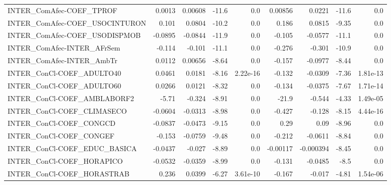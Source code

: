 \begin{tabular}{lrrrrrrrr}
INTER\_ComAfec-COEF\_TPROF              &      0.0013 &      0.00608 &    -11.6 &      0.0 &    0.00856 &      0.0221 &        -11.6 &           0.0 \\
INTER\_ComAfec-COEF\_USOCINTURON        &       0.101 &       0.0804 &    -10.2 &      0.0 &      0.186 &      0.0815 &        -9.35 &           0.0 \\
INTER\_ComAfec-COEF\_USODISPMOB         &     -0.0895 &      -0.0844 &    -11.9 &      0.0 &     -0.105 &     -0.0577 &        -11.1 &           0.0 \\
INTER\_ComAfec-INTER\_AFrSem            &      -0.114 &       -0.101 &    -11.1 &      0.0 &     -0.276 &      -0.301 &        -10.9 &           0.0 \\
INTER\_ComAfec-INTER\_AmbTr             &      0.0112 &      0.00656 &    -8.64 &      0.0 &     -0.157 &     -0.0977 &        -8.44 &           0.0 \\
INTER\_ConCl-COEF\_ADULTO40             &      0.0461 &       0.0181 &    -8.16 & 2.22e-16 &     -0.132 &     -0.0309 &        -7.36 &      1.81e-13 \\
INTER\_ConCl-COEF\_ADULTO60             &      0.0266 &       0.0121 &    -8.32 &      0.0 &     -0.134 &     -0.0375 &        -7.67 &      1.71e-14 \\
INTER\_ConCl-COEF\_AMBLABORF2           &       -5.71 &       -0.324 &    -8.91 &      0.0 &      -21.9 &      -0.544 &        -4.33 &      1.49e-05 \\
INTER\_ConCl-COEF\_CLIMASECO            &     -0.0604 &      -0.0313 &    -8.98 &      0.0 &     -0.427 &      -0.128 &        -8.15 &      4.44e-16 \\
INTER\_ConCl-COEF\_CONGCD               &     -0.0837 &      -0.0473 &    -9.15 &      0.0 &       0.29 &        0.09 &        -8.96 &           0.0 \\
INTER\_ConCl-COEF\_CONGEF               &      -0.153 &      -0.0759 &    -9.48 &      0.0 &     -0.212 &     -0.0611 &        -8.84 &           0.0 \\
INTER\_ConCl-COEF\_EDUC\_BASICA          &     -0.0437 &       -0.027 &    -8.89 &      0.0 &   -0.00117 &   -0.000394 &        -8.45 &           0.0 \\
INTER\_ConCl-COEF\_HORAPICO             &     -0.0532 &      -0.0359 &    -8.99 &      0.0 &     -0.131 &     -0.0485 &         -8.5 &           0.0 \\
INTER\_ConCl-COEF\_HORASTRAB            &       0.236 &       0.0399 &    -6.27 & 3.61e-10 &     -0.167 &      -0.017 &        -4.81 &      1.54e-06 \\

\end{tabular}
